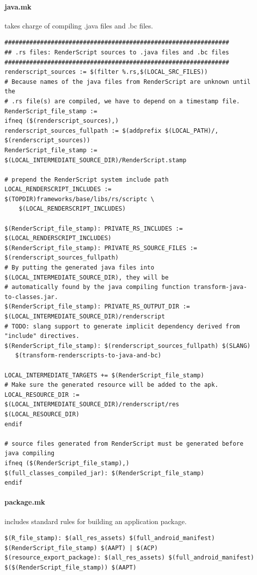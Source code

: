 \paragraph{java.mk} takes charge of compiling .java files and .bc files.
\begin{lstlisting}[style=nonumbers]
###############################################################
## .rs files: RenderScript sources to .java files and .bc files
###############################################################
renderscript_sources := $(filter %.rs,$(LOCAL_SRC_FILES))
# Because names of the java files from RenderScript are unknown until the
# .rs file(s) are compiled, we have to depend on a timestamp file.
RenderScript_file_stamp :=
ifneq ($(renderscript_sources),)
renderscript_sources_fullpath := $(addprefix $(LOCAL_PATH)/, $(renderscript_sources))
RenderScript_file_stamp := $(LOCAL_INTERMEDIATE_SOURCE_DIR)/RenderScript.stamp

# prepend the RenderScript system include path
LOCAL_RENDERSCRIPT_INCLUDES := $(TOPDIR)frameworks/base/libs/rs/scriptc \
    $(LOCAL_RENDERSCRIPT_INCLUDES)

$(RenderScript_file_stamp): PRIVATE_RS_INCLUDES := $(LOCAL_RENDERSCRIPT_INCLUDES)
$(RenderScript_file_stamp): PRIVATE_RS_SOURCE_FILES := $(renderscript_sources_fullpath)
# By putting the generated java files into $(LOCAL_INTERMEDIATE_SOURCE_DIR), they will be
# automatically found by the java compiling function transform-java-to-classes.jar.
$(RenderScript_file_stamp): PRIVATE_RS_OUTPUT_DIR := $(LOCAL_INTERMEDIATE_SOURCE_DIR)/renderscript
# TODO: slang support to generate implicit dependency derived from "include" directives.
$(RenderScript_file_stamp): $(renderscript_sources_fullpath) $(SLANG)
   $(transform-renderscripts-to-java-and-bc)

LOCAL_INTERMEDIATE_TARGETS += $(RenderScript_file_stamp)
# Make sure the generated resource will be added to the apk.
LOCAL_RESOURCE_DIR := $(LOCAL_INTERMEDIATE_SOURCE_DIR)/renderscript/res $(LOCAL_RESOURCE_DIR)
endif

# source files generated from RenderScript must be generated before java compiling
ifneq ($(RenderScript_file_stamp),)
$(full_classes_compiled_jar): $(RenderScript_file_stamp)
endif

\end{lstlisting}

\paragraph{package.mk} includes standard rules for building an application package.
\begin{lstlisting}[style=nonumbers]
$(R_file_stamp): $(all_res_assets) $(full_android_manifest) $(RenderScript_file_stamp) $(AAPT) | $(ACP)
$(resource_export_package): $(all_res_assets) $(full_android_manifest) $($(RenderScript_file_stamp)) $(AAPT)
\end{lstlisting}

